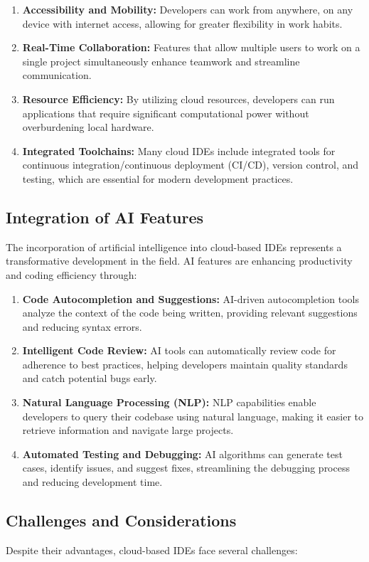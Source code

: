 \documentclass[12pt,a4paper,final]{report}
\begin{document}
\begin{enumerate}
    \item \textbf{Accessibility and Mobility:} Developers can work from anywhere, on any device with internet access, allowing for greater flexibility in work habits.
    \item \textbf{Real-Time Collaboration:} Features that allow multiple users to work on a single project simultaneously enhance teamwork and streamline communication.
    \item \textbf{Resource Efficiency:} By utilizing cloud resources, developers can run applications that require significant computational power without overburdening local hardware.
    \item \textbf{Integrated Toolchains:} Many cloud IDEs include integrated tools for continuous integration/continuous deployment (CI/CD), version control, and testing, which are essential for modern development practices.
\end{enumerate}

\subsection{Integration of AI Features}
The incorporation of artificial intelligence into cloud-based IDEs represents a transformative development in the field. AI features are enhancing productivity and coding efficiency through:

\begin{enumerate}
    \item \textbf{Code Autocompletion and Suggestions:} AI-driven autocompletion tools analyze the context of the code being written, providing relevant suggestions and reducing syntax errors.
    \item \textbf{Intelligent Code Review:} AI tools can automatically review code for adherence to best practices, helping developers maintain quality standards and catch potential bugs early.
    \item \textbf{Natural Language Processing (NLP):} NLP capabilities enable developers to query their codebase using natural language, making it easier to retrieve information and navigate large projects.
    \item \textbf{Automated Testing and Debugging:} AI algorithms can generate test cases, identify issues, and suggest fixes, streamlining the debugging process and reducing development time.
\end{enumerate}

\subsection{Challenges and Considerations}
Despite their advantages, cloud-based IDEs face several challenges:
\end{document}

